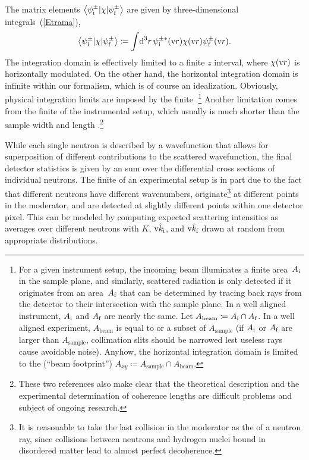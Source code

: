 %
The matrix elements $\left\langle \psi^\pm_{\text{i}}|\chi|\psi^\pm_{\text{f}}\right\rangle$
are given by three-dimensional integrals~(\ref{Etrama}),
\begin{equation}\label{Etrama3}
  \left\langle \psi_{\text{i}}^\pm|\chi|\psi_{\text{f}}^\pm\right\rangle
  \coloneqq  \int\!\text{d}^3r\, \psi^{\pm*}_{\text{i}}(\text{v}{r})\chi(\text{v}{r})\psi^\pm_{\text{f}}(\text{v}{r}).
\end{equation}
The integration domain is effectively limited to a finite $z$ interval,
where $\chi(\text{v}{r})$ is horizontally modulated.
On the other hand, the horizontal integration domain is infinite
within our formalism,
which is of course an idealization.
Obviously, physical integration limits are imposed by the finite
.\footnote
{For a given instrument setup,
the incoming beam illuminates a finite area~$A_{\text{i}}$ in the sample plane,
and similarly, scattered radiation is only detected if it originates
from an area~$A_{\text{f}}$ that can be determined
by tracing back rays from the detector
to their intersection with the sample plane.
In a well aligned instrument, $A_{\text{i}}$ and $A_{\text{f}}$ are nearly the same.
Let $A_\text{beam}\coloneqq A_{\text{i}}\cap A_{\text{f}}$.
In a well aligned experiment,
$A_\text{beam}$ is equal to or a subset of $A_\text{sample}$
(if $A_{\text{i}}$ or $A_{\text{f}}$ are larger than $A_\text{sample}$,
collimation slits should be narrowed
lest useless rays cause avoidable noise).
Anyhow, the horizontal integration domain
is limited to the  (``beam footprint'')
$A_{xy}\coloneqq A_\text{sample}\cap A_\text{beam}$.}
%
%
%
Another limitation comes from the finite 
of the instrumental setup,
which usually is much shorter than the sample width and length
\cite{HaPR10,MaMM14}.\footnote
{These two references also make clear that
  the theoretical description and the experimental determination of
  coherence lengths are difficult problems and subject of ongoing research.}

While each single neutron is described by a wavefunction
that allows for  superposition of
different contributions to the scattered wavefunction,
the final detector statistics
%
is given by an  sum
over the differential cross sections of individual neutrons.
The finite 
%
of an experimental setup is in part due to the fact that
different neutrons have different wavenumbers,
originate\footnote
{It is reasonable to take the last collision in the moderator
  as the  of a neutron ray,
  since collisions between neutrons and hydrogen nuclei bound in
  disordered matter lead to almost perfect decoherence.}
at different points in the moderator,
and are detected at slightly different points within one detector pixel.
This can be modeled by computing expected scattering intensities as
averages over different neutrons with 
$K$, $\text{v}{\hat k}_{\text{i}}$, and $\text{v}{\hat k}_{\text{f}}$ drawn at random
from appropriate distributions.

